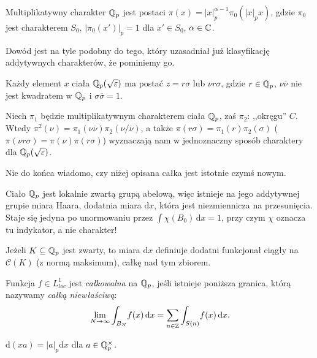 \begin{fakt}
	Multiplikatywny charakter $\mathbb Q_p$ jest postaci $\pi(x) = |x|_p^{\alpha - 1} \pi_0(|x|_p x)$, gdzie $\pi_0$ jest charakterem $S_0$, $|\pi_0(x')|_p = 1$ dla $x' \in S_0$, $\alpha \in \mathbb C$.
\end{fakt}

Dowód jest na tyle podobny do tego, który uzasadniał już klasyfikację addytywnych charakterów, że pominiemy go.

Każdy element $x$ ciała $\mathbb Q_p (\sqrt{\varepsilon})$ ma postać $z = r \sigma$ lub $ \nu r \sigma$, gdzie $r \in \mathbb Q_p$, $\nu \overline \nu$ nie jest kwadratem w $\mathbb Q_p$ i $\sigma \overline \sigma = 1$.

\begin{fakt}
	Niech  $\pi_1$ będzie multiplikatywnym charakterem ciała $\mathbb Q_p$, zaś $\pi_2$: ,,okręgu'' $C$.
	Wtedy $\pi^2(\nu) = \pi_1(\nu \overline \nu) \pi_2 (\nu / \overline \nu)$, a także $\pi(r \sigma) = \pi_1(r)\pi_2(\sigma)$ ($\pi(\nu r \sigma) = \pi(\nu)\pi(r\sigma)$) wyznaczają nam w jednoznaczny sposób charaktery dla $\mathbb Q_p(\sqrt \varepsilon)$.
\end{fakt}

Nie do końca wiadomo, czy niżej opisana całka jest istotnie czymś nowym.

Ciało  $\mathbb Q_p$ jest lokalnie zwartą grupą abelową, więc istnieje na jego addytywnej grupie miara Haara, dodatnia miara $\textrm{d}x$, która jest niezmiennicza na przesunięcia.
Staje się jedyna po unormowaniu przez $\int \chi(B_0) \,\textrm{d}x = 1$, przy czym $\chi$ oznacza tu indykator, a nie charakter!

Jeżeli  $K \subseteq \mathbb Q_p$ jest zwarty, to miara $\textrm{d}x$ definiuje dodatni funkcjonał ciągły na $\mathcal C(K)$ (z normą maksimum), całkę nad tym zbiorem.

\begin{definicja}
	Funkcja $f \in L^1_{loc}$ jest \emph{całkowalna} na $\mathbb Q_p$, jeśli istnieje poniższa granica, którą nazywamy \emph{całką niewłaściwą}:
	\[
		\lim_{N \to \infty} \int_{B_N} \! f(x)\,\textrm{d}x = \sum_{n \in \mathbb Z} \int_{S(n)} \!f(x)\,\textrm{d}x.
	\]
\end{definicja}

\begin{fakt}
	$\textrm{d}(xa) = |a|_p \textrm{d}x$  dla $a \in \mathbb Q_p^\times$.
\end{fakt}

